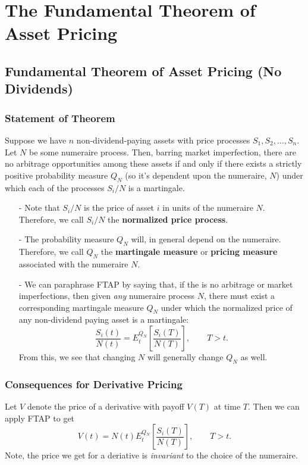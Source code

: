 \documentclass[12pt]{article}
\theoremstyle{plain}
\theoremstyle{definition}
\theoremstyle{remark}
\begin{document}
\newpage
\section{The Fundamental Theorem of Asset Pricing}

\subsection{Fundamental Theorem of Asset Pricing (No Dividends)}

\subsubsection{Statement of Theorem}

Suppose we have $n$ non-dividend-paying assets with
price processes $S_1, S_2, \ldots, S_n$.  Let $N$ be some numeraire
process.  Then, barring market imperfection, there are no arbitrage
opportunities among these assets if and only if there exists a strictly
positive probability measure $Q_N$ (so it's dependent upon the numeraire,
$N$) under which each of the processes $S_i / N$ is a martingale.
\begin{itemize}
   \item[-]{Note that $S_i/N$ is the price of asset $i$ in units of the
      numeraire $N$.  Therefore, we call $S_i/N$ the \textbf{normalized
      price process}.}
   \item[-]{The probability measure $Q_N$ will, in general depend on
	 the numeraire.  Therefore, we call $Q_N$ the 
	 \textbf{martingale measure} or \textbf{pricing measure} 
	 associated with the numeraire $N$.} 
   \item[-]{We can paraphrase FTAP by saying that, if the is no arbitrage
	 or market imperfections, then given \emph{any} numeraire 
	 process $N$, there must exist a corresponding martingale
	 measure $Q_N$ under which the normalized price of any 
	 non-dividend paying asset is a martingale:
	    \[ \frac{S_i(t)}{N(t)} = E_t^{Q_N}\left[ \frac{S_i(T)}{N(T)}
	       \right], \qquad T > t. \]
	 From this, we see that changing $N$ will generally change 
	 $Q_N$ as well.
      }
\end{itemize}

\subsubsection{Consequences for Derivative Pricing}

Let $V$ denote the price of a derivative with payoff $V(T)$ at time $T$.
Then we can apply FTAP to get
   \[ V(t) = N(t) E_t^{Q_N} \left[ \frac{S_i(T)}{N(T)}
	       \right], \qquad T > t. \]
Note, the price we get for a deriative is \emph{invariant} to the choice
of the numeraire.
\end{document}
